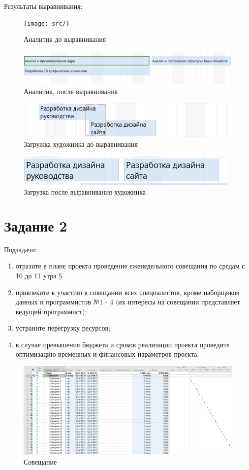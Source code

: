 Результаты выравнивания:
\begin{figure}[H]
	\centering
	\texttt{[image: src/]}
	\caption{Аналитик до выравнивания}
	\label{fig:}
\end{figure}
\begin{figure}[H]
	\centering
	\includegraphics[width=0.7\linewidth]{src/Снимок}
	\caption{Аналитик, после выравнивания}
	\label{fig:}
\end{figure}
\begin{figure}[H]
	\centering
	\includegraphics[width=0.7\linewidth]{"src/Художник до"}
	\caption{Загружка художника до выравнивания}
	\label{fig:-}
\end{figure}
\begin{figure}[H]
	\centering
	\includegraphics[width=0.7\linewidth]{"src/Художник после"}
	\caption{Загрузка после выравнивания художника}
	\label{fig:-}
\end{figure}




\section{Задание 2}
Подзадачи:
\begin{enumerate}
	\item отразите в плане проекта проведение еженедельного совещания по
	средам с 10 до 11 утра \ref{fig:lab321}
	\item привлеките к участию в совещании всех специалистов, кроме
	наборщиков данных и программистов №1 - 4 (их интересы на совещании
	представляет ведущий программист);
	\item устраните перегрузку ресурсов;
	\item в случае превышения бюджета и сроков реализации проекта проведите
	оптимизацию временных и финансовых параметров проекта.
\end{enumerate}

\begin{figure}[h]
	\centering
	\includegraphics[width=0.7\linewidth]{src/lab3_2_1}
	\caption{Совещание}
	\label{fig:lab321}
\end{figure}

